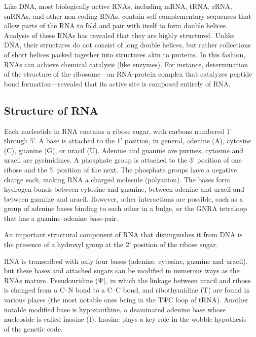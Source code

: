 Like DNA, most biologically active RNAs, including mRNA, tRNA, rRNA, snRNAs, and other non-coding RNAs, contain self-complementary sequences that allow parts of the RNA to fold and pair with itself to form double helices. Analysis of these RNAs has revealed that they are highly structured. Unlike DNA, their structures do not consist of long double helices, but rather collections of short helices packed together into structures akin to proteins. In this fashion, RNAs can achieve chemical catalysis (like enzymes). For instance, determination of the structure of the ribosome---an RNA-protein complex that catalyzes peptide bond formation---revealed that its active site is composed entirely of RNA.

\hypertarget{structure-of-rna}{%
\subsection{Structure of RNA}\label{structure-of-rna}}

Each nucleotide in RNA contains a ribose sugar, with carbons numbered 1' through 5'. A base is attached to the 1' position, in general, adenine (A), cytosine (C), guanine (G), or uracil (U). Adenine and guanine are purines, cytosine and uracil are pyrimidines. A phosphate group is attached to the 3' position of one ribose and the 5' position of the next. The phosphate groups have a negative charge each, making RNA a charged molecule (polyanion). The bases form hydrogen bonds between cytosine and guanine, between adenine and uracil and between guanine and uracil. However, other interactions are possible, such as a group of adenine bases binding to each other in a bulge, or the GNRA tetraloop that has a guanine--adenine base-pair.

An important structural component of RNA that distinguishes it from DNA is the presence of a hydroxyl group at the 2' position of the ribose sugar.

RNA is transcribed with only four bases (adenine, cytosine, guanine and uracil), but these bases and attached sugars can be modified in numerous ways as the RNAs mature. Pseudouridine (Ψ), in which the linkage between uracil and ribose is changed from a C--N bond to a C--C bond, and ribothymidine (T) are found in various places (the most notable ones being in the TΨC loop of tRNA). Another notable modified base is hypoxanthine, a deaminated adenine base whose nucleoside is called inosine (I). Inosine plays a key role in the wobble hypothesis of the genetic code.

